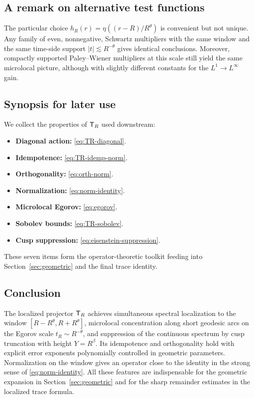 \subsection{A remark on alternative test functions}\label{subsec:proj-tests}
The particular choice $h_R(r)=\eta((r-R)/R^\theta)$ is convenient but not unique.
Any family of even, nonnegative, Schwartz multipliers with the same window and the same time-side support $|t|\lesssim R^{-\theta}$ gives identical conclusions.
Moreover, compactly supported Paley–Wiener multipliers at this scale still yield the same microlocal picture, although with slightly different constants for the $L^1\to L^\infty$ gain.

\subsection{Synopsis for later use}\label{subsec:proj-synopsis}
We collect the properties of $\mathsf{T}_R$ used downstream:
\begin{itemize}
\item \textbf{Diagonal action:} \eqref{eq:TR-diagonal}.
\item \textbf{Idempotence:} \eqref{eq:TR-idemp-norm}.
\item \textbf{Orthogonality:} \eqref{eq:orth-norm}.
\item \textbf{Normalization:} \eqref{eq:norm-identity}.
\item \textbf{Microlocal Egorov:} \eqref{eq:egorov}.
\item \textbf{Sobolev bounds:} \eqref{eq:TR-sobolev}.
\item \textbf{Cusp suppression:} \eqref{eq:eisenstein-suppression}.
\end{itemize}
These seven items form the operator-theoretic toolkit feeding into Section~\ref{sec:geometric} and the final trace identity.

\subsection{Conclusion}\label{subsec:proj-conclusion}
The localized projector $\mathsf{T}_R$ achieves simultaneous spectral localization to the window $[R-R^\theta,R+R^\theta]$, microlocal concentration along short geodesic arcs on the Egorov scale $t_R\sim R^{-\theta}$, and suppression of the continuous spectrum by cusp truncation with height $Y=R^\beta$.
Its idempotence and orthogonality hold with explicit error exponents polynomially controlled in geometric parameters.
Normalization on the window gives an operator close to the identity in the strong sense of \eqref{eq:norm-identity}.
All these features are indispensable for the geometric expansion in Section~\ref{sec:geometric} and for the sharp remainder estimates in the localized trace formula.

